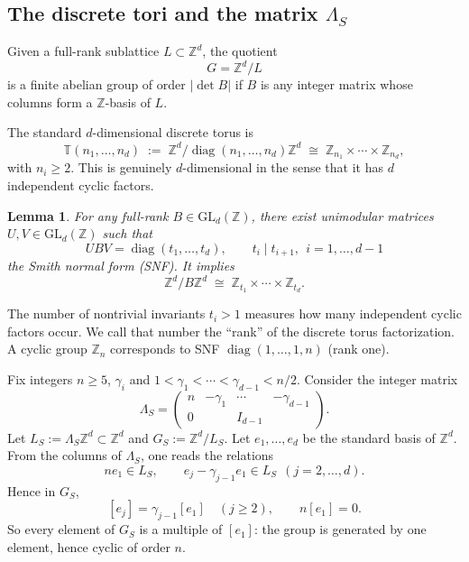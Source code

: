 \documentclass[11pt]{amsart}
\DeclareMathOperator{\diag}{diag}
\newcommand{\Z}{\mathbb Z}
\newcommand{\GL}{\mathrm{GL}}
\theoremstyle{plain}
\newtheorem{lemma}[theorem]{Lemma}
\theoremstyle{definition}
\numberwithin{equation}{section}
\begin{document}
\subsection{The discrete tori and the matrix \texorpdfstring{$\Lambda_S$}{LambdaS}}\label{sub:discretetori}
Given a full-rank sublattice $L\subset \Z^d$, the quotient
\[
G=\Z^d/L
\]
is a finite abelian group of order $|\det B|$ if $B$ is any integer matrix whose columns form a $\Z$-basis of $L$.


The standard $d$-dimensional discrete torus is
\[
\mathbb{T}(n_1,\dots,n_d)\;:=\;\Z^d/\diag(n_1,\dots,n_d)\Z^d\;\cong\;\Z_{n_1}\times\cdots\times \Z_{n_d},
\]
with $n_i\ge 2$.  This is genuinely $d$-dimensional in the sense that it has $d$ independent cyclic factors. 

\begin{lemma}
For any full-rank $B\in \GL_d(\Z)$, there exist unimodular matrices $U,V\in \GL_d(\Z)$ such that
\[
UBV=\diag(t_1,\dots,t_d),\qquad t_i\mid t_{i+1}, ~~i=1,\ldots,d-1
\]
the Smith normal form (SNF).  It implies
\[
\Z^d/B\Z^d\;\cong\;\Z_{t_1}\times\cdots\times \Z_{t_d}.
\]
\end{lemma}

The number of nontrivial invariants $t_i>1$ measures how many independent cyclic factors occur. We call that number the ``rank'' of the discrete torus factorization.
A cyclic group $\Z_n$ corresponds to SNF $\diag(1,\dots,1,n)$ (rank one).


\medskip
Fix integers $n\geq5$, $\gamma_i$ and $1<\gamma_1<\cdots<\gamma_{d-1}<n/2$. Consider the integer matrix
\begin{equation}\label{eq:LambdaS}
\Lambda_S=\begin{pmatrix}
n & -\gamma_1 & \cdots & -\gamma_{d-1}\\
0 & & I_{d-1} &
\end{pmatrix}.
\end{equation}
Let $L_S:=\Lambda_S\Z^d\subset \Z^d$ and $G_S:=\Z^d/L_S$. Let $e_1,\dots,e_d$ be the standard basis of $\Z^d$.
From the columns of $\Lambda_S$, one reads the relations
\[
 n e_1\in L_S,\qquad e_{j}-\gamma_{j-1}e_1\in L_S\ \ (j=2,\dots,d).
\]
Hence in $G_S$,
\[
 [e_j]=\gamma_{j-1}[e_1]\quad(j\ge 2),\qquad n[e_1]=0.
\]
So every element of $G_S$ is a multiple of $[e_1]$: the group is generated by one element, hence cyclic of order $n$.
\end{document}
